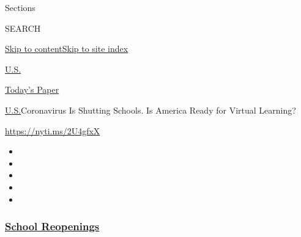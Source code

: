 Sections

SEARCH

\protect\hyperlink{site-content}{Skip to
content}\protect\hyperlink{site-index}{Skip to site index}

\href{https://www.nytimes3xbfgragh.onion/section/us}{U.S.}

\href{https://myaccount.nytimes3xbfgragh.onion/auth/login?response_type=cookie\&client_id=vi}{}

\href{https://www.nytimes3xbfgragh.onion/section/todayspaper}{Today's
Paper}

\href{/section/us}{U.S.}\textbar{}Coronavirus Is Shutting Schools. Is
America Ready for Virtual Learning?

\url{https://nyti.ms/2U4gfxX}

\begin{itemize}
\item
\item
\item
\item
\item
\end{itemize}

\hypertarget{school-reopenings}{%
\subsubsection{\texorpdfstring{\href{https://www.nytimes3xbfgragh.onion/spotlight/schools-reopening?name=styln-coronavirus-schools-reopening\&region=TOP_BANNER\&block=storyline_menu_recirc\&action=click\&pgtype=Article\&impression_id=b7994850-f4b7-11ea-b2ea-e95a284183ee\&variant=undefined}{School
Reopenings}}{School Reopenings}}\label{school-reopenings}}

